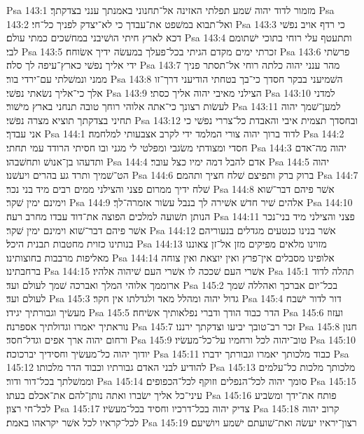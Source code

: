 Psa 143:1  מזמור לדוד יהוה שׁמע תפלתי האזינה אל־תחנוני באמנתך ענני בצדקתך׃
Psa 143:2  ואל־תבוא במשׁפט את־עבדך כי לא־יצדק לפניך כל־חי׃
Psa 143:3  כי רדף אויב נפשׁי דכא לארץ חיתי הושׁיבני במחשׁכים כמתי עולם׃
Psa 143:4  ותתעטף עלי רוחי בתוכי ישׁתומם לבי׃
Psa 143:5  זכרתי ימים מקדם הגיתי בכל־פעלך במעשׂה ידיך אשׂוחח׃
Psa 143:6  פרשׂתי ידי אליך נפשׁי כארץ־עיפה לך סלה׃
Psa 143:7  מהר ענני יהוה כלתה רוחי אל־תסתר פניך ממני ונמשׁלתי עם־ירדי בור׃
Psa 143:8  השׁמיעני בבקר חסדך כי־בך בטחתי הודיעני דרך־זו אלך כי־אליך נשׂאתי נפשׁי׃
Psa 143:9  הצילני מאיבי יהוה אליך כסתי׃
Psa 143:10  למדני לעשׂות רצונך כי־אתה אלוהי רוחך טובה תנחני בארץ מישׁור׃
Psa 143:11  למען־שׁמך יהוה תחיני בצדקתך תוציא מצרה נפשׁי׃
Psa 143:12  ובחסדך תצמית איבי והאבדת כל־צררי נפשׁי כי אני עבדך׃
Psa 144:1  לדוד ברוך יהוה צורי המלמד ידי לקרב אצבעותי למלחמה׃
Psa 144:2  חסדי ומצודתי משׂגבי ומפלטי לי מגני ובו חסיתי הרודד עמי תחתי׃
Psa 144:3  יהוה מה־אדם ותדעהו בן־אנושׁ ותחשׁבהו׃
Psa 144:4  אדם להבל דמה ימיו כצל עובר׃
Psa 144:5  יהוה הט־שׁמיך ותרד גע בהרים ויעשׁנו׃
Psa 144:6  ברוק ברק ותפיצם שׁלח חציך ותהמם׃
Psa 144:7  שׁלח ידיך ממרום פצני והצילני ממים רבים מיד בני נכר׃
Psa 144:8  אשׁר פיהם דבר־שׁוא וימינם ימין שׁקר׃
Psa 144:9  אלהים שׁיר חדשׁ אשׁירה לך בנבל עשׂור אזמרה־לך׃
Psa 144:10  הנותן תשׁועה למלכים הפוצה את־דוד עבדו מחרב רעה׃
Psa 144:11  פצני והצילני מיד בני־נכר אשׁר פיהם דבר־שׁוא וימינם ימין שׁקר׃
Psa 144:12  אשׁר בנינו כנטעים מגדלים בנעוריהם בנותינו כזוית מחטבות תבנית היכל׃
Psa 144:13  מזוינו מלאים מפיקים מזן אל־זן צאוננו מאליפות מרבבות בחוצותינו׃
Psa 144:14  אלופינו מסבלים אין־פרץ ואין יוצאת ואין צוחה ברחבתינו׃
Psa 144:15  אשׁרי העם שׁככה לו אשׁרי העם שׁיהוה אלהיו׃
Psa 145:1  תהלה לדוד ארוממך אלוהי המלך ואברכה שׁמך לעולם ועד׃
Psa 145:2  בכל־יום אברכך ואהללה שׁמך לעולם ועד׃
Psa 145:3  גדול יהוה ומהלל מאד ולגדלתו אין חקר׃
Psa 145:4  דור לדור ישׁבח מעשׂיך וגבורתיך יגידו׃
Psa 145:5  הדר כבוד הודך ודברי נפלאותיך אשׂיחה׃
Psa 145:6  ועזוז נוראתיך יאמרו וגדולתיך אספרנה׃
Psa 145:7  זכר רב־טובך יביעו וצדקתך ירננו׃
Psa 145:8  חנון ורחום יהוה ארך אפים וגדל־חסד׃
Psa 145:9  טוב־יהוה לכל ורחמיו על־כל־מעשׂיו׃
Psa 145:10  יודוך יהוה כל־מעשׂיך וחסידיך יברכוכה׃
Psa 145:11  כבוד מלכותך יאמרו וגבורתך ידברו׃
Psa 145:12  להודיע לבני האדם גבורתיו וכבוד הדר מלכותו׃
Psa 145:13  מלכותך מלכות כל־עלמים וממשׁלתך בכל־דור ודור׃
Psa 145:14  סומך יהוה לכל־הנפלים וזוקף לכל־הכפופים׃
Psa 145:15  עיני־כל אליך ישׂברו ואתה נותן־להם את־אכלם בעתו׃
Psa 145:16  פותח את־ידך ומשׂביע לכל־חי רצון׃
Psa 145:17  צדיק יהוה בכל־דרכיו וחסיד בכל־מעשׂיו׃
Psa 145:18  קרוב יהוה לכל־קראיו לכל אשׁר יקראהו באמת׃
Psa 145:19  רצון־יראיו יעשׂה ואת־שׁועתם ישׁמע ויושׁיעם׃
